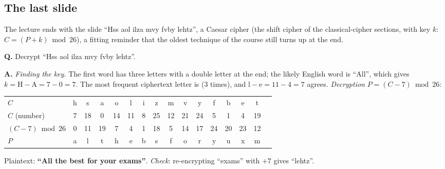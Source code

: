 \subsection*{The last slide}
The lecture ends with the slide ``Hss aol ilza mvy fvby lehtz'', a Caesar cipher (the shift cipher of the classical-cipher sections, with key $k$: $C = (P + k) \bmod 26$), a fitting reminder that the oldest technique of the course still turns up at the end.
\begin{worked}
\textbf{Q.} Decrypt ``Hss aol ilza mvy fvby lehtz''.

\textbf{A.} \emph{Finding the key.} The first word has three letters with a double letter at the end; the likely English word is ``All'', which gives $k = \mathrm{H} - \mathrm{A} = 7 - 0 = 7$. The most frequent ciphertext letter is  (3 times), and $\mathrm{l} - \mathrm{e} = 11 - 4 = 7$ agrees. \emph{Decryption} $P = (C - 7) \bmod 26$:
\begin{center}\small
\setlength{\tabcolsep}{4pt}
\begin{tabular}{@{}lccccccccccccccc@{}}
\toprule
$C$ & h & s & a & o & l & i & z & m & v & y & f & b & e & t\\
$C$ (number) & 7 & 18 & 0 & 14 & 11 & 8 & 25 & 12 & 21 & 24 & 5 & 1 & 4 & 19\\
$(C - 7) \bmod 26$ & 0 & 11 & 19 & 7 & 4 & 1 & 18 & 5 & 14 & 17 & 24 & 20 & 23 & 12\\
$P$ & a & l & t & h & e & b & s & f & o & r & y & u & x & m\\
\bottomrule
\end{tabular}
\end{center}
Plaintext: \textbf{``All the best for your exams''}. \emph{Check}: re-encrypting ``exams'' with $+7$ gives ``lehtz''.
\end{worked}


